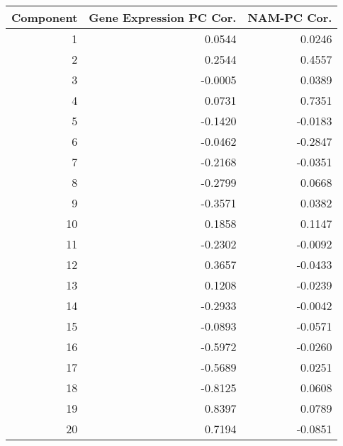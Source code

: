 \begin{tabular}{rrr}
\toprule
 Component &  Gene Expression PC Cor. &  NAM-PC Cor. \\
\midrule
         1 &                   0.0544 &       0.0246 \\
         2 &                   0.2544 &       0.4557 \\
         3 &                  -0.0005 &       0.0389 \\
         4 &                   0.0731 &       0.7351 \\
         5 &                  -0.1420 &      -0.0183 \\
         6 &                  -0.0462 &      -0.2847 \\
         7 &                  -0.2168 &      -0.0351 \\
         8 &                  -0.2799 &       0.0668 \\
         9 &                  -0.3571 &       0.0382 \\
        10 &                   0.1858 &       0.1147 \\
        11 &                  -0.2302 &      -0.0092 \\
        12 &                   0.3657 &      -0.0433 \\
        13 &                   0.1208 &      -0.0239 \\
        14 &                  -0.2933 &      -0.0042 \\
        15 &                  -0.0893 &      -0.0571 \\
        16 &                  -0.5972 &      -0.0260 \\
        17 &                  -0.5689 &       0.0251 \\
        18 &                  -0.8125 &       0.0608 \\
        19 &                   0.8397 &       0.0789 \\
        20 &                   0.7194 &      -0.0851 \\
\bottomrule
\end{tabular}
